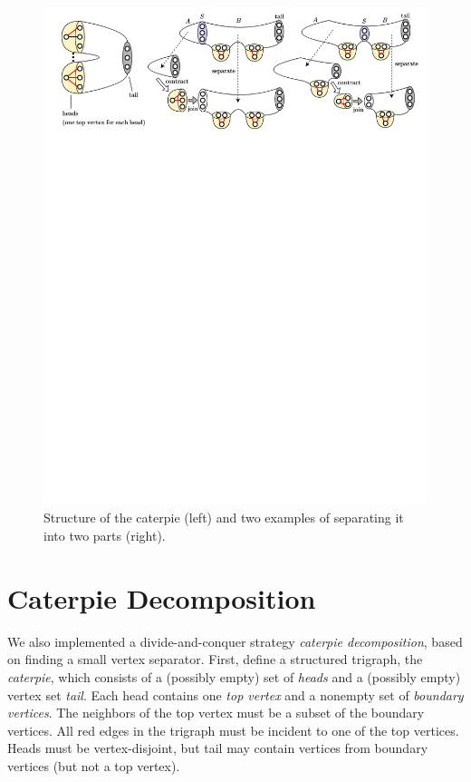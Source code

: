 \documentclass[a4paper,UKenglish,cleveref, autoref, thm-restate]{lipics-v2021}
\begin{document}
\begin{figure}[t!]
    \centering
    \includegraphics[clip,width=1.0\textwidth,trim={80 3300 80 0}]{images/decomp.png}
    \caption{Structure of the caterpie (left) and
    two examples of separating it into two parts (right).
    }
    \label{fig:decomp} 
\end{figure}

\section{Caterpie Decomposition}

We also implemented a divide-and-conquer strategy \emph{caterpie decomposition},
based on finding a small vertex separator.
%
First, define a structured trigraph, the \emph{caterpie},
which consists of a (possibly empty) set of \emph{heads} and
a (possibly empty) vertex set \emph{tail}.
%
Each head contains one \emph{top vertex} and a nonempty set of \emph{boundary vertices}.
The neighbors of the top vertex must be a subset of the boundary vertices.
All red edges in the trigraph must be incident to one of the top vertices.
Heads must be vertex-disjoint, but tail may contain vertices from boundary vertices
(but not a top vertex).
\end{document}
